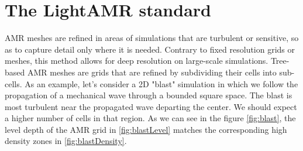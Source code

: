 \documentclass[
	a4paper,
	12pt,
	raggedright,
	twoside
]{tufte-style-article}
\theoremstyle{definition}
\theoremstyle{remark}
\begin{document}
\section{The LightAMR standard} \label{sec:lightAMR}
\Gls{AMR} meshes are refined in areas of simulations that are turbulent or sensitive, so as to capture detail only where it is needed. Contrary to fixed resolution grids or meshes, this method allows for deep resolution on large-scale simulations. Tree-based \Gls{AMR} meshes are grids that are refined by subdividing their cells into sub-cells. As an example, let's consider a 2D "blast" simulation in which we follow the propagation of a mechanical wave through a bounded square space. The blast is most turbulent near the propagated wave departing the center. We should expect a higher number of cells in that region. As we can see in the figure \ref{fig:blast}, the level depth of the \Gls{AMR} grid in \ref{fig:blastLevel} matches the corresponding high density zones in \ref{fig:blastDensity}.
\begin{figure}[!htb]
\end{figure}
\end{document}
